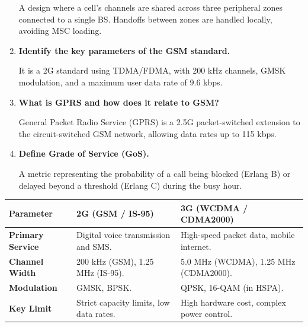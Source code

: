 \documentclass[12pt,a4paper]{article}
\newcommand{\Q}[1]{\textbf{#1}\par\noindent\ignorespaces}
\renewcommand{\arraystretch}{1.45}
\begin{document}
\begin{tcolorbox}[exambox, title={\textbf{Frequently Asked / Viva Questions}}]
\begin{enumerate}[topsep=0pt, label=\textbf{Q\arabic*.}, itemsep=5pt]
    A design where a cell's channels are shared across three peripheral zones connected to a single BS. Handoffs between zones are handled locally, avoiding MSC loading.
  \item \Q{Identify the key parameters of the GSM standard.}
    It is a 2G standard using TDMA/FDMA, with 200 kHz channels, GMSK modulation, and a maximum user data rate of 9.6 kbps.
  \item \Q{What is GPRS and how does it relate to GSM?}
    General Packet Radio Service (GPRS) is a 2.5G packet-switched extension to the circuit-switched GSM network, allowing data rates up to 115 kbps.
  \item \Q{Define Grade of Service (GoS).}
    A metric representing the probability of a call being blocked (Erlang B) or delayed beyond a threshold (Erlang C) during the busy hour.
\end{enumerate}
\end{tcolorbox}

\begin{tcolorbox}[tikzbox, title={Comparison of 2G and 3G Cellular Technologies}]
\renewcommand{\arraystretch}{1.4}
\par\noindent
{\renewcommand{\arraystretch}{1.55}%
\begin{tabularx}{\linewidth}{|B{3.0cm}|Y|Y|}\hline
\textbf{Parameter} & \textbf{\color{myteal}2G (GSM / IS-95)} & \textbf{\color{myred}3G (WCDMA / CDMA2000)} \\[4pt]
\hline
\textbf{Primary Service} & Digital voice transmission and SMS. & High-speed packet data, mobile internet. \\[4pt]
\hline
\textbf{Channel Width} & 200 kHz (GSM), 1.25 MHz (IS-95). & 5.0 MHz (WCDMA), 1.25 MHz (CDMA2000). \\
\hline
\textbf{Modulation} & GMSK, BPSK. & QPSK, 16-QAM (in HSPA). \\
\hline
\textbf{Key Limit} & Strict capacity limits, low data rates. & High hardware cost, complex power control. \\[4pt]
\hline
\end{tabularx}
}
\end{tcolorbox}
\end{document}
